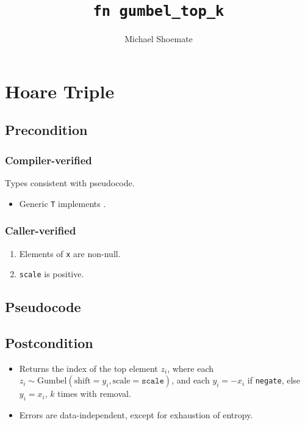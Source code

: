 \documentclass{article}
\title{\texttt{fn gumbel\_top\_k}}
\author{Michael Shoemate}
\begin{document}
  
\maketitle 
 
\section{Hoare Triple} 
\subsection*{Precondition} 
\subsubsection*{Compiler-verified}
Types consistent with pseudocode.

\begin{itemize}
    \item Generic \texttt{T} implements .
\end{itemize}

\subsubsection*{Caller-verified}
\begin{enumerate}
    \item Elements of \texttt{x} are non-null.
    \item \texttt{scale} is positive.
\end{enumerate}
 
\subsection*{Pseudocode} 
\label{sec:python-pseudocode} 
 
 
\subsection*{Postcondition} 

\begin{theorem}
    \label{postcondition}
    \begin{itemize}
        \item Returns the index of the top element $z_i$,
        where each $z_i \sim \mathrm{Gumbel}(\mathrm{shift}=y_i, \mathrm{scale}=\texttt{scale})$,
        and each $y_i = -x_i$ if \texttt{negate}, else $y_i = x_i$,
        $k$ times with removal.
        \item Errors are data-independent, except for exhaustion of entropy.
    \end{itemize}
\end{theorem}
\end{document}
